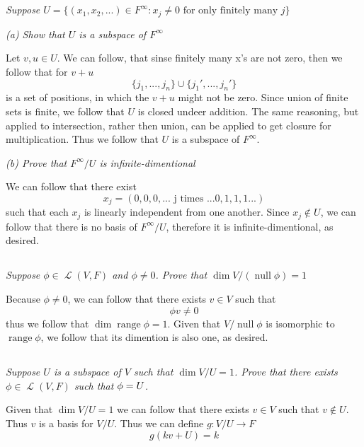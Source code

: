 \documentclass[11pt,oneside,titlepage]{book}
\DeclareMathOperator \map {\mathcal {L}}
\DeclareMathOperator \ns {null}
\DeclareMathOperator \range {range}
\begin{document}
\subsection{}

\textit{Suppose
  $U = \{(x_1, x_2, ...) \in F^{\infty}: x_j \neq 0 \text{ for only finitely many }j\}$ }

\textit{(a) Show that $U$ is a subspace of $F^{\infty}$}

Let $v, u \in U$. We can follow, that sinse finitely many x's are not zero, then we
follow that for $v + u$
$$\{j_1, ..., j_n\} \cup \{j_1', ..., j_n'\} $$
is a set of positions, in which the $v + u$ might not be zero. Since union of finite sets is
finite, we follow that $U$ is closed undeer addition. The same reasoning, but applied to
intersection, rather then union, can be applied to  get closure for multiplication.
Thus we follow that $U$ is a subspace of $F^\infty$.

\textit{(b) Prove that $F^\infty/U$ is infinite-dimentional}

We can follow that there exist
$$x_j = (0, 0, 0, ...\text{ j times }... 0, 1, 1, 1...)$$
such that each $x_j$ is linearly independent from one another. Since $x_j \notin U$, we can
follow that there is no basis of $F^\infty/U$, therefore it is infinite-dimentional, as desired.


\subsection{}

\textit{Suppose $\phi \in \map(V, F)$ and $\phi \neq 0$. Prove that $\dim V / (\ns \phi) = 1$}

Because $\phi \neq 0$, we can follow that there exists $v \in V$ such that
$$\phi v \neq 0$$
thus we follow that $\dim \range \phi = 1$. Given that $V / \ns \phi$ is isomorphic to
$\range \phi$, we follow that its dimention is also one, as desired.

\subsection{}

\textit{Suppose $U$ is a subspace of $V$ such that $\dim V/U = 1$. Prove that there exists
  $\phi \in \map(V, F)$ such that $\null \phi = U$.}

Given that $\dim V/U = 1$ we can follow that there exists $v \in V$ such that $v \notin U$.
Thus $v$ is a basis for $V/U$. Thus we can define $g: V/U \to F$
$$g(kv + U) = k$$
\end{document}
